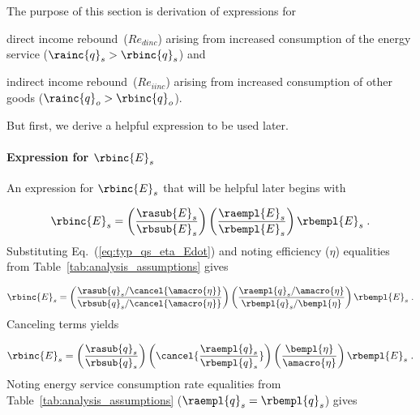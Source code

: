The purpose of this section is derivation of expressions for 
%
\begin{enumerate*}[label={(\roman*)}]
	
  \item direct income rebound~($Re_{dinc}$) 
        arising from increased consumption of the energy service 
        ($\rainc{q}_s > \rbinc{q}_s$) and
  
  \item indirect income rebound~($Re_{iinc}$) 
        arising from increased consumption of other goods 
        ($\rainc{q}_o > \rbinc{q}_o$).
    
\end{enumerate*}

But first, we derive a helpful expression to be used later.

\paragraph{Expression for $\rbinc{E}_s$}
\label{sec:E_dot_s_hat_expression}

An expression for $\rbinc{E}_s$ that will be helpful later
begins with

\begin{equation}
  \rbinc{E}_s = \left( \frac{\rasub{E}_s}{\rbsub{E}_s} \right)
                \left( \frac{\raempl{E}_s}{\rbempl{E}_s} \right)
                \rbempl{E}_s \; .
\end{equation}
%
Substituting Eq.~(\ref{eq:typ_qs_eta_Edot}) and noting efficiency ($\eta$)
equalities from Table~\ref{tab:analysis_assumptions} gives

\begin{equation}
  \rbinc{E}_s = \left( \frac{\rasub{q}_s / \cancel{\amacro{\eta}}}{\rbsub{q}_s / \cancel{\amacro{\eta}}} \right)
                \left( \frac{\raempl{q}_s / \amacro{\eta}}{\rbempl{q}_s / \bempl{\eta}} \right)
                \rbempl{E}_s \; .
\end{equation}
%
Canceling terms yields

\begin{equation}
  \rbinc{E}_s = \left( \frac{\rasub{q}_s}{\rbsub{q}_s} \right)
                \left( \cancel{\frac{\raempl{q}_s}{\rbempl{q}_s}} \right)
                \left( \frac{\bempl{\eta}}{\amacro{\eta}}  \right)
                \rbempl{E}_s \; .
\end{equation}
%
Noting energy service consumption rate equalities from Table~\ref{tab:analysis_assumptions}
($\raempl{q}_s = \rbempl{q}_s$) gives

